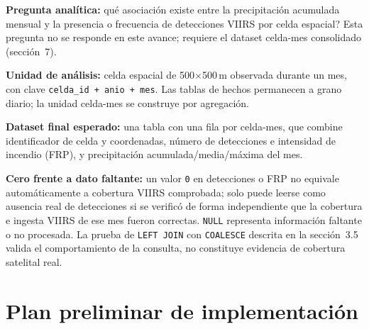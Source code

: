 \documentclass[11pt,a4paper]{article}
\begin{document}
\textbf{Pregunta anal\'itica:} \textquestiondown qu\'e asociaci\'on existe entre la precipitaci\'on acumulada mensual y la presencia o frecuencia de detecciones VIIRS por celda espacial? Esta pregunta no se responde en este avance; requiere el dataset celda-mes consolidado (secci\'on~7).

\textbf{Unidad de an\'alisis:} celda espacial de 500$\times$500\,m observada durante un mes, con clave \texttt{celda\_id + anio + mes}. Las tablas de hechos permanecen a grano diario; la unidad celda-mes se construye por agregaci\'on.

\textbf{Dataset final esperado:} una tabla con una fila por celda-mes, que combine identificador de celda y coordenadas, n\'umero de detecciones e intensidad de incendio (FRP), y precipitaci\'on acumulada/media/m\'axima del mes.

\vspace{0.15cm}
\noindent\footnotesize\textbf{Cero frente a dato faltante:} un valor \texttt{0} en detecciones o FRP no equivale autom\'aticamente a cobertura VIIRS comprobada; solo puede leerse como ausencia real de detecciones si se verific\'o de forma independiente que la cobertura e ingesta VIIRS de ese mes fueron correctas. \texttt{NULL} representa informaci\'on faltante o no procesada. La prueba de \texttt{LEFT JOIN} con \texttt{COALESCE} descrita en la secci\'on~3.5 valida el comportamiento de la consulta, no constituye evidencia de cobertura satelital real.\normalsize

\section{Plan preliminar de implementaci\'on}
\end{document}
